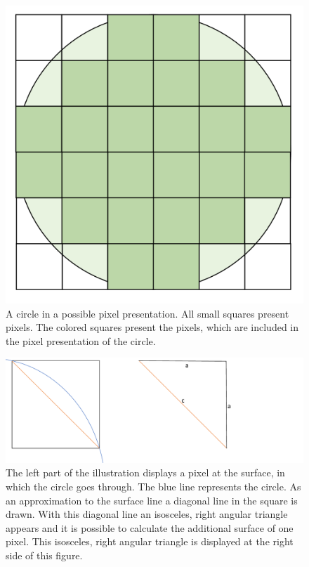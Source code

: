 \begin{figure}
	\center
	\includegraphics[scale=0.15]{figures/PixelCircleSquare.png}
	\caption{A circle in a possible pixel presentation. All small squares present pixels. The colored squares present the pixels, which are included in the pixel presentation of the circle.}
	\label{img:CircleSquarePixels}
\end{figure}

\begin{figure}
	\center
	\includegraphics[scale=0.3]{figures/SurfaceApproximationSQRT2.png}
	\caption{The left part of the illustration displays a pixel at the surface, in which the circle goes through. The blue line represents the circle. As an approximation to the surface line a diagonal line in the square is drawn. With this diagonal line an isosceles, right angular triangle appears and it is possible to calculate the additional surface of one pixel. This isosceles, right angular triangle is displayed at the right side of this figure.}
	\label{img:ApproximationSQRT2}
\end{figure}

